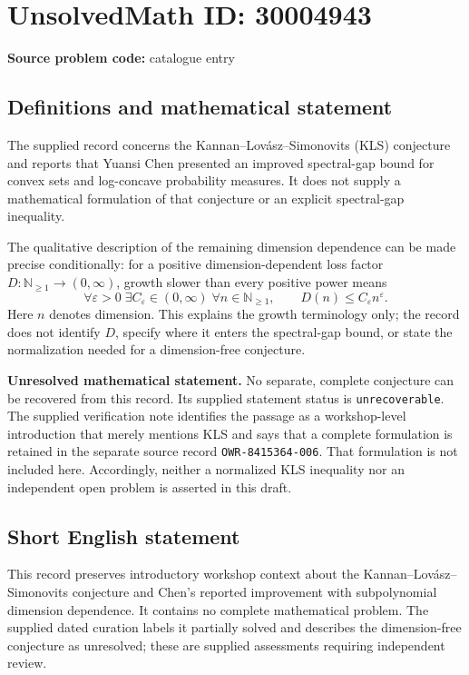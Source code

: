 \documentclass[11pt]{article}
\newcommand{\N}{\mathbb{N}}
\begin{document}
\section*{UnsolvedMath ID: 30004943}
\textbf{Source problem code:} catalogue entry
\subsection{Definitions and mathematical statement}
The supplied record concerns the Kannan--Lov\'asz--Simonovits (KLS) conjecture and reports that Yuansi Chen presented an improved spectral-gap bound for convex sets and log-concave probability measures. It does not supply a mathematical formulation of that conjecture or an explicit spectral-gap inequality.

The qualitative description of the remaining dimension dependence can be made precise conditionally: for a positive dimension-dependent loss factor \(D\colon\N_{\geq 1}\to(0,\infty)\), growth slower than every positive power means
\[
\forall\varepsilon>0\;\exists C_\varepsilon\in(0,\infty)\;\forall n\in\N_{\geq 1},\qquad D(n)\leq C_\varepsilon n^\varepsilon.
\]
Here \(n\) denotes dimension. This explains the growth terminology only; the record does not identify \(D\), specify where it enters the spectral-gap bound, or state the normalization needed for a dimension-free conjecture.

\textbf{Unresolved mathematical statement.} No separate, complete conjecture can be recovered from this record. Its supplied statement status is \texttt{unrecoverable}. The supplied verification note identifies the passage as a workshop-level introduction that merely mentions KLS and says that a complete formulation is retained in the separate source record \texttt{OWR-8415364-006}. That formulation is not included here. Accordingly, neither a normalized KLS inequality nor an independent open problem is asserted in this draft.
\subsection{Short English statement}
This record preserves introductory workshop context about the Kannan--Lov\'asz--Simonovits conjecture and Chen's reported improvement with subpolynomial dimension dependence. It contains no complete mathematical problem. The supplied dated curation labels it partially solved and describes the dimension-free conjecture as unresolved; these are supplied assessments requiring independent review.
\end{document}
